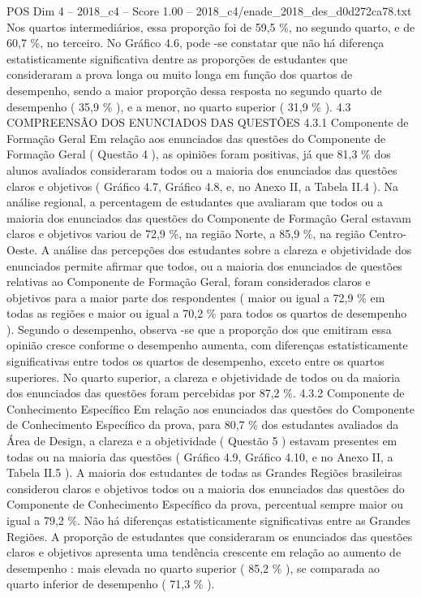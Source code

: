\begin{textsample}{POS Dim 4 – 2018\_c4 – Score 1.00 – 2018\_c4/enade\_2018\_des\_d0d272ca78.txt}
Nos quartos intermediários, essa proporção foi de 59,5 \%, no segundo quarto, e de 60,7 \%, no terceiro.
No Gráfico 4.6, pode -se constatar que não há diferença estatisticamente significativa dentre as proporções de estudantes que consideraram a prova longa ou muito longa em função dos quartos de desempenho, sendo a maior proporção dessa resposta no segundo quarto de desempenho ( 35,9 \% ), e a menor, no quarto superior ( 31,9 \% ). 4.3 COMPREENSÃO DOS ENUNCIADOS DAS QUESTÕES 4.3.1 Componente de Formação Geral Em relação aos enunciados das questões do Componente de Formação Geral ( Questão 4 ), as opiniões foram positivas, já que 81,3 \% dos alunos avaliados consideraram todos ou a maioria dos enunciados das questões claros e objetivos ( Gráfico 4.7, Gráfico 4.8, e, no Anexo II, a Tabela II.4 ).
Na análise regional, a percentagem de estudantes que avaliaram que todos ou a maioria dos enunciados das questões do Componente de Formação Geral estavam claros e objetivos variou de 72,9 \%, na região Norte, a 85,9 \%, na região Centro-Oeste.
A análise das percepções dos estudantes sobre a clareza e objetividade dos enunciados permite afirmar que todos, ou a maioria dos enunciados de questões relativas ao Componente de Formação Geral, foram considerados claros e objetivos para a maior parte dos respondentes ( maior ou igual a 72,9 \% em todas as regiões e maior ou igual a 70,2 \% para todos os quartos de desempenho ).
Segundo o desempenho, observa -se que a proporção dos que emitiram essa opinião cresce conforme o desempenho aumenta, com diferenças estatisticamente significativas entre todos os quartos de desempenho, exceto entre os quartos superiores.
No quarto superior, a clareza e objetividade de todos ou da maioria dos enunciados das questões foram percebidas por 87,2 \%. 4.3.2 Componente de Conhecimento Específico Em relação aos enunciados das questões do Componente de Conhecimento Específico da prova, para 80,7 \% dos estudantes avaliados da Área de Design, a clareza e a objetividade ( Questão 5 ) estavam presentes em todas ou na maioria das questões ( Gráfico 4.9, Gráfico 4.10, e no Anexo II, a Tabela II.5 ).
A maioria dos estudantes de todas as Grandes Regiões brasileiras considerou claros e objetivos todos ou a maioria dos enunciados das questões do Componente de Conhecimento Específico da prova, percentual sempre maior ou igual a 79,2 \%.
Não há diferenças estatisticamente significativas entre as Grandes Regiões.
A proporção de estudantes que consideraram os enunciados das questões claros e objetivos apresenta uma tendência crescente em relação ao aumento de desempenho : mais elevada no quarto superior ( 85,2 \% ), se comparada ao quarto inferior de desempenho ( 71,3 \% ).

\end{textsample}

